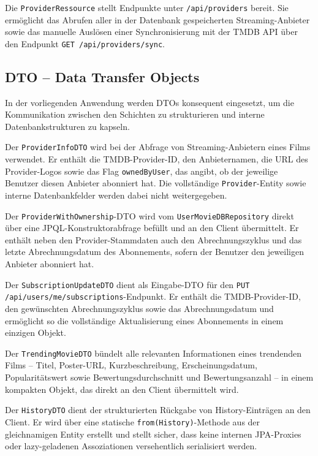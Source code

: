 Die \texttt{ProviderRessource} stellt Endpunkte unter \texttt{/api/providers}
bereit. Sie ermöglicht das Abrufen aller in der Datenbank gespeicherten
Streaming-Anbieter sowie das manuelle Auslösen einer Synchronisierung mit
der TMDB API über den Endpunkt \texttt{GET /api/providers/sync}.

\subsection{DTO -- Data Transfer Objects}

In der vorliegenden Anwendung werden DTOs konsequent eingesetzt, um die
Kommunikation zwischen den Schichten zu strukturieren und interne
Datenbankstrukturen zu kapseln.

Der \texttt{ProviderInfoDTO} wird bei der Abfrage von Streaming-Anbietern
eines Films verwendet. Er enthält die TMDB-Provider-ID, den Anbieternamen,
die URL des Provider-Logos sowie das Flag \texttt{ownedByUser}, das angibt,
ob der jeweilige Benutzer diesen Anbieter abonniert hat. Die vollständige
\texttt{Provider}-Entity sowie interne Datenbankfelder werden dabei nicht
weitergegeben.

Der \texttt{ProviderWithOwnership}-DTO wird vom \texttt{UserMovieDBRepository}
direkt über eine JPQL-Konstruktorabfrage befüllt und an den Client
übermittelt. Er enthält neben den Provider-Stammdaten auch den
Abrechnungszyklus und das letzte Abrechnungsdatum des Abonnements, sofern
der Benutzer den jeweiligen Anbieter abonniert hat.

Der \texttt{SubscriptionUpdateDTO} dient als Eingabe-DTO für den
\texttt{PUT /api/users/me/subscriptions}-Endpunkt. Er enthält die
TMDB-Provider-ID, den gewünschten Abrechnungszyklus sowie das
Abrechnungsdatum und ermöglicht so die vollständige Aktualisierung eines
Abonnements in einem einzigen Objekt.

Der \texttt{TrendingMovieDTO} bündelt alle relevanten Informationen eines
trendenden Films -- Titel, Poster-URL, Kurzbeschreibung, Erscheinungsdatum,
Popularitätswert sowie Bewertungsdurchschnitt und Bewertungsanzahl -- in
einem kompakten Objekt, das direkt an den Client übermittelt wird.

Der \texttt{HistoryDTO} dient der strukturierten Rückgabe von
History-Einträgen an den Client. Er wird über eine statische
\texttt{from(History)}-Methode aus der gleichnamigen Entity erstellt und
stellt sicher, dass keine internen JPA-Proxies oder lazy-geladenen
Assoziationen versehentlich serialisiert werden.

